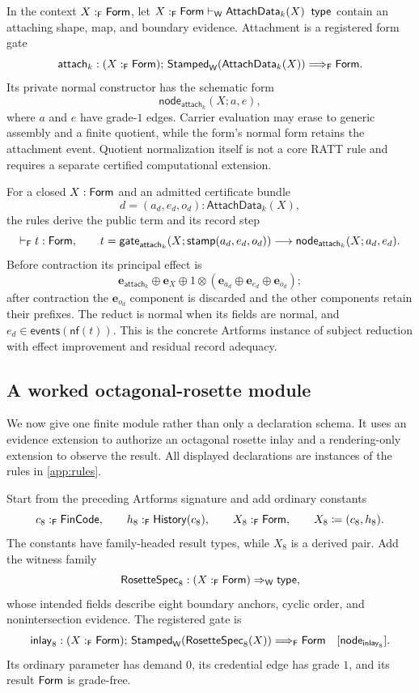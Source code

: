 \documentclass[11pt]{article}
\numberwithin{equation}{section}
\theoremstyle{definition}
\theoremstyle{plain}
\theoremstyle{remark}
\newcommand{\Type}{\mathsf{type}}
\renewcommand{\Form}{\AFForm}
\newcommand{\Hist}{\AFHistory}
\newcommand{\Stamped}{\mathsf{Stamped}}
\newcommand{\Frm}{\mathsf F}
\newcommand{\Wit}{\mathsf W}
\newcommand{\events}{\mathsf{events}}
\newcommand{\nf}{\mathsf{nf}}
\newcommand{\unit}{\mathbf e}
\newcommand{\jtype}{\mathrel{\mathsf{type}}}
\begin{document}
In the context \(X:_{\Frm}\Form\), let
\(X:_{\Frm}\Form\vdash_{\Wit}\mathsf{AttachData}_k(X)\;\jtype\) contain an
attaching shape, map, and boundary evidence.  Attachment is a registered
form gate
\[
 \mathsf{attach}_k:
 (X:_{\Frm}\Form);\,
 \Stamped_\Wit(\mathsf{AttachData}_k(X))
 \Longrightarrow_{\Frm}\Form.
\]
Its private normal constructor has the schematic form
\[
 \mathsf{node}_{\mathsf{attach}_k}(X;a,e),
\]
where \(a\) and \(e\) have grade-\(1\) edges.  Carrier evaluation may erase to
generic assembly and a finite quotient, while the form's normal form retains
the attachment event.  Quotient normalization itself is not a core RATT rule
and requires a separate certified computational extension.

For a closed \(X:\Form\) and an admitted certificate bundle
\[
 d=(a_d,e_d,o_d):\mathsf{AttachData}_k(X),
\]
the rules derive the public term and its record step
\[
 \vdash_{\Frm}t:\Form,
 \qquad
 t=\mathsf{gate}_{\mathsf{attach}_k}
   (X;\mathsf{stamp}(a_d,e_d,o_d))
 \longrightarrow
 \mathsf{node}_{\mathsf{attach}_k}(X;a_d,e_d).
\]
Before contraction its principal effect is
\[
 \unit_{\mathsf{attach}_k}\oplus\unit_X\oplus
  1\otimes(\unit_{a_d}\oplus\unit_{e_d}\oplus\unit_{o_d});
\]
after contraction the \(\unit_{o_d}\) component is discarded and the other
components retain their prefixes.  The reduct is normal when its fields are
normal, and \(e_d\in\events(\nf(t))\).  This is the concrete Artforms instance
of subject reduction with effect improvement and residual record adequacy.

\subsection{A worked octagonal-rosette module}\label{sec:rosette-module}

We now give one finite module rather than only a declaration schema.  It uses
an evidence extension to authorize an octagonal rosette inlay and a
rendering-only extension to observe the result.  All displayed declarations
are instances of the rules in \cref{app:rules}.

Start from the preceding Artforms signature and add ordinary constants
\[
 c_8:_{\Frm}\AFFinCode,
 \qquad
 h_8:_{\Frm}\Hist(c_8),
 \qquad
 X_8:_{\Frm}\Form,
 \qquad X_8\coloneqq(c_8,h_8).
\]
The constants have family-headed result types, while \(X_8\) is a derived
pair.  Add the witness family
\[
 \mathsf{RosetteSpec}_8:
 (X:_{\Frm}\Form)\Rightarrow_{\Wit}\Type,
\]
whose intended fields describe eight boundary anchors, cyclic order, and
nonintersection evidence.  The registered gate is
\[
 \mathsf{inlay}_8:
 (X:_{\Frm}\Form);\,
 \Stamped_\Wit(\mathsf{RosetteSpec}_8(X))
 \Longrightarrow_{\Frm}\Form
 \quad[\mathsf{node}_{\mathsf{inlay}_8}].
\]
Its ordinary parameter has demand \(0\), its credential edge has grade \(1\),
and its result \(\Form\) is grade-free.
\end{document}
